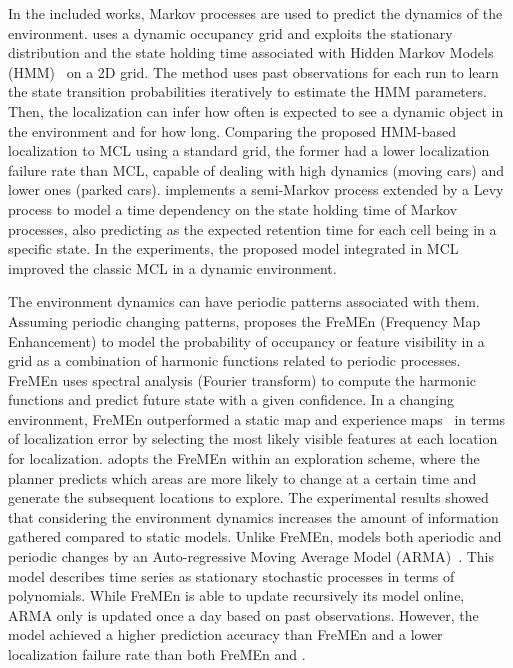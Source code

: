 In the included works, Markov processes are used to predict the dynamics of the environment.
\cite{tipaldi-et-al:2013:0278364913502830} uses a dynamic occupancy grid and exploits the stationary distribution and the state holding time associated with Hidden Markov Models (HMM)~\parencite{original:hmm} on a 2D grid. The method uses past observations for each run to learn the state transition probabilities iteratively to estimate the HMM parameters. Then, the localization can infer how often is expected to see a dynamic object in the environment and for how long. Comparing the proposed HMM-based localization to MCL using a standard grid, the former had a lower localization failure rate than MCL, capable of dealing with high dynamics (moving cars) and lower ones (parked cars).
\cite{rapp-et-al:2015:77} implements a semi-Markov process extended by a Levy process to model a time dependency on the state holding time of Markov processes, also predicting as \cite{tipaldi-et-al:2013:0278364913502830} the expected retention time for each cell being in a specific state. In the experiments, the proposed model integrated in MCL improved the classic MCL in a dynamic environment.

The environment dynamics can have periodic patterns associated with them.
Assuming periodic changing patterns, \cite{krajník-et-al:2017:2665664} proposes the FreMEn (Frequency Map Enhancement) to model the probability of occupancy or feature visibility in a grid as a combination of harmonic functions related to periodic processes. FreMEn uses spectral analysis (Fourier transform) to compute the harmonic functions and predict future state with a given confidence. In a changing environment, FreMEn outperformed a static map and experience maps~\parencite{churchill-newman:2013:0278364913499193} in terms of localization error by selecting the most likely visible features at each location for localization.
\cite{santos-et-al:2016:2516594} adopts the FreMEn within an exploration scheme, where the planner predicts which areas are more likely to change at a certain time and generate the subsequent locations to explore. The experimental results showed that considering the environment dynamics increases the amount of information gathered compared to static models.
Unlike FreMEn, \cite{wang-et-al:2020:9468884} models both aperiodic and periodic changes by an Auto-regressive Moving Average Model (ARMA)~\parencite{original:arma}. This model describes time series as stationary stochastic processes in terms of polynomials. While FreMEn is able to update recursively its model online, ARMA only is updated once a day based on past observations. However, the model achieved a higher prediction accuracy than FreMEn and a lower localization failure rate than both FreMEn and \cite{tipaldi-et-al:2013:0278364913502830}.

